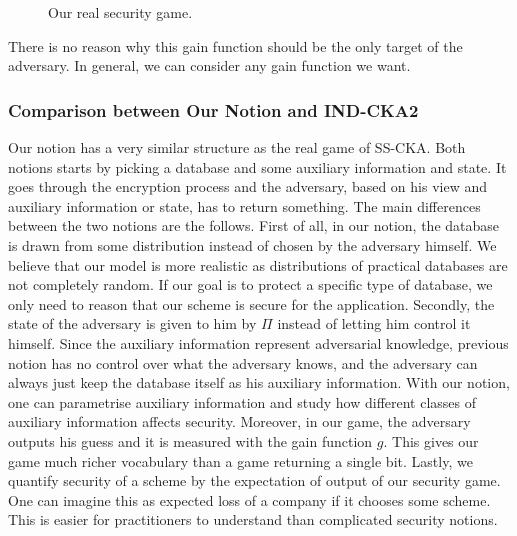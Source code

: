 \begin{figure}[H]
	\begin{pchstack}[center]
	\end{pchstack}
	\caption{Our real security game.}
\end{figure}

There is no reason why this gain function should be the only target of the adversary. In general, we can consider any gain function we want.




\subsubsection{Comparison between Our Notion and IND-CKA2}
Our notion has a very similar structure as the real game of SS-CKA. Both notions starts by picking a database and some auxiliary information and state. It goes through the encryption process and the adversary, based on his view and auxiliary information or state, has to return something. The main differences between the two notions are the follows. First of all, in our notion, the database is drawn from some distribution instead of chosen by the adversary himself. We believe that our model is more realistic as distributions of practical databases are not completely random. If our goal is to protect a specific type of database, we only need to reason that our scheme is secure for the application. Secondly, the state of the adversary is given to him by $\Pi$ instead of letting him control it himself. Since the auxiliary information represent adversarial knowledge, previous notion has no control over what the adversary knows, and the adversary can always just keep the database itself as his auxiliary information. With our notion, one can parametrise auxiliary information and study how different classes of auxiliary information affects security. Moreover, in our game, the adversary outputs his guess and it is measured with the gain function $g$. This gives our game much richer vocabulary than a game returning a single bit. Lastly, we quantify security of a scheme by the expectation of output of our security game. One can imagine this as expected loss of a company if it chooses some scheme. This is easier for practitioners to understand than complicated security notions.
